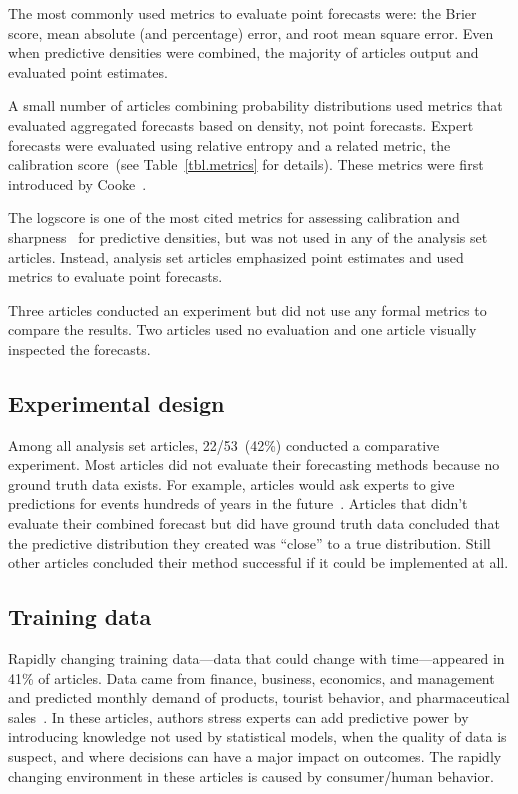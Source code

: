 \documentclass[preprint]{elsarticle}
\begin{document}
The most commonly used metrics to evaluate point forecasts were: the Brier score, mean absolute (and percentage) error, and root mean square error.
Even when predictive densities were combined, the majority of articles output and evaluated point estimates.

A small number of articles combining probability distributions used metrics that evaluated aggregated forecasts based on density, not point forecasts.
Expert forecasts were evaluated using relative entropy and a related metric, the calibration score~(see Table~\ref{tbl.metrics} for details).
These metrics were first introduced by Cooke~\cite{cooke1988calibration,cooke1991experts}.

The logscore is one of the most cited metrics for assessing calibration and sharpness~\cite{gneiting2007strictly,gneiting2011comparing,hora2015calibration} for predictive densities, but was not used in any of the analysis set articles.
Instead, analysis set articles emphasized point estimates and used metrics to evaluate point forecasts.

Three articles conducted an experiment but did not use any formal metrics to compare the results.
Two articles used no evaluation and one article visually inspected the forecasts.

\subsection{Experimental design}

Among all analysis set articles, 22/53~(42\%) conducted a comparative experiment.
Most articles did not evaluate their forecasting methods because no ground truth data exists.
For example, articles would ask experts to give predictions for events hundreds of years in the future~\cite{zio1997accounting,zio1996use}.
Articles that didn't evaluate their combined forecast but did have ground truth data concluded that the predictive distribution they created was ``close'' to a true distribution.
Still other articles concluded their method successful if it could be implemented at all.

\subsection{Training data}
Rapidly changing training data---data that could change with time---appeared in 41\% of articles.
Data came from finance, business, economics, and management and predicted monthly demand of products, tourist behavior, and pharmaceutical sales~\cite{baecke2017investigating,petrovic2006fuzzy,wang2008probabilistic,klas2010support,franses2011averaging}.
In these articles, authors stress experts can add predictive power by introducing knowledge not used by statistical models, when the quality of data is suspect, and where decisions can have a major impact on outcomes. 
The rapidly changing environment in these articles is caused by consumer/human behavior.
\end{document}
